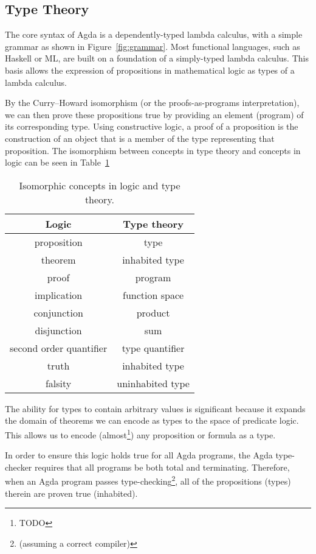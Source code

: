 

\subsection{Type Theory}
The core syntax of Agda is a dependently-typed lambda calculus, with a simple grammar as shown in Figure~\ref{fig:grammar}. Most functional languages, such as Haskell or ML, are built on a foundation of a simply-typed lambda calculus. This basis allows the expression of propositions in mathematical logic as types of a lambda calculus.

By the Curry–Howard isomorphism (or the proofs-as-programs interpretation), we can then prove these propositions true by providing an element (program) of its corresponding type.\cite{poernomo2005} Using constructive logic, a proof of a proposition is the construction of an object that is a member of the type representing that proposition. The isomorphism between concepts in type theory and concepts in logic can be seen in Table~\ref{tab:curry_howard}

\begin{table}
\begin{center}
\begin{tabular}{c|c}
Logic & Type theory \\
\hline
proposition & type\\
theorem & inhabited type\\
proof & program\\
implication & function space\\
conjunction & product\\
disjunction & sum\\
second order quantifier & type quantifier\\
truth & inhabited type\\
falsity & uninhabited type\\
\end{tabular}
\end{center}
\caption{Isomorphic concepts in logic and type theory.}
\label{tab:curry_howard}
\end{table}

The ability for types to contain arbitrary values is significant because it expands the domain of theorems we can encode as types to the space of predicate logic. This allows us to encode (almost\footnote{TODO}) any proposition or formula as a type.

 In order to ensure this logic holds true for all Agda programs, the Agda type-checker requires that all programs be both total and terminating.\cite{norell2009} Therefore, when an Agda program passes type-checking\footnote{(assuming a correct compiler)}, all of the propositions (types) therein are proven true (inhabited).

